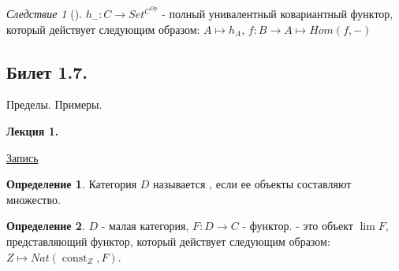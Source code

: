 \documentclass[a4paper]{article}
\newcommand{\mybox}{%
    \collectbox{%
        \setlength{\fboxsep}{1pt}%
        \fbox{\BOXCONTENT}%
    }%
}
\theoremstyle{indented}
\theoremstyle{definition}
\newtheorem{defn}{Определение}
\theoremstyle{remark}
\newtheorem{cons}{Следствие}
\DeclareMathOperator{\ra}{\rightarrow}
\DeclareMathOperator{\const}{const}
\begin{document}
\begin{cons}[]
    $h_-: C \ra Set^{C^{Op}}$ - полный унивалентный ковариантный функтор, который действует следующим образом: $A \mapsto h_A$, $f: B \ra A \mapsto Hom(f, -)$
\end{cons}



\newpage

\subsection{Билет 1.7.}

Пределы. Примеры. 

\hrulefill

\textbf{Лекция 1.} 

\begin{flushright}
    \mybox{
        \href{https://disk.yandex.ru/d/knoQ44wLmGDwwQ/2021-2022%20учебный%20год%20(осенний%20семестр)/2%20курс/Теоретическая%20информатика/Теор%20информатика%2C%20лекция%2C%2001.09.2021.mp4}{Запись}
    }
\end{flushright}

\begin{defn}
    Категория $D$ называется , если ее объекты составляют множество.
\end{defn}

\begin{defn}
    $D$ - малая категория, $F: D \ra C$ - функтор.  - это объект $\lim F$, представляющий функтор, который действует следующим образом: $Z \mapsto Nat(\const_Z, F)$. 
\end{defn}
\end{document}
